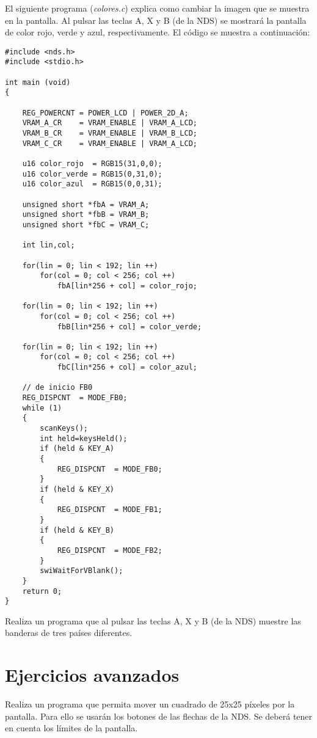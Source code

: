 \begin{example}
El siguiente programa (\textit{colores.c}) explica como cambiar la imagen que se muestra en la pantalla. Al pulsar las teclas A, X y B (de la NDS) se mostrará la pantalla de color rojo, verde y azul, respectivamente. El código se muestra a continuación:

\begin{lstlisting}	
#include <nds.h>
#include <stdio.h>

int main (void)
{
	
	REG_POWERCNT = POWER_LCD | POWER_2D_A;
	VRAM_A_CR    = VRAM_ENABLE | VRAM_A_LCD;
	VRAM_B_CR    = VRAM_ENABLE | VRAM_B_LCD;
	VRAM_C_CR    = VRAM_ENABLE | VRAM_A_LCD;
	
	u16 color_rojo  = RGB15(31,0,0);
	u16 color_verde = RGB15(0,31,0);
	u16 color_azul  = RGB15(0,0,31);
	
	unsigned short *fbA = VRAM_A;
	unsigned short *fbB = VRAM_B;
	unsigned short *fbC = VRAM_C;
	
	int lin,col;
	
	for(lin = 0; lin < 192; lin ++)
		for(col = 0; col < 256; col ++)
			fbA[lin*256 + col] = color_rojo;
	
	for(lin = 0; lin < 192; lin ++)
		for(col = 0; col < 256; col ++)
			fbB[lin*256 + col] = color_verde;
	
	for(lin = 0; lin < 192; lin ++)
		for(col = 0; col < 256; col ++)
			fbC[lin*256 + col] = color_azul;
	
	// de inicio FB0
	REG_DISPCNT  = MODE_FB0;
	while (1)
	{
		scanKeys();
		int held=keysHeld();
		if (held & KEY_A)
		{
			REG_DISPCNT  = MODE_FB0;
		}
		if (held & KEY_X)
		{
			REG_DISPCNT  = MODE_FB1;
		}
		if (held & KEY_B)
		{
			REG_DISPCNT  = MODE_FB2;
		}
		swiWaitForVBlank();
	}
	return 0;
}
\end{lstlisting}
\end{example}


\begin{exercise}
Realiza un programa que al pulsar las teclas A, X y B (de la NDS) muestre las banderas de tres países diferentes.
\end{exercise}


\section{Ejercicios avanzados}

\begin{exercise}
Realiza un programa que permita mover un cuadrado de 25x25 píxeles por la pantalla. Para ello se usarán los botones de las flechas de la NDS. Se deberá tener en cuenta los límites de la pantalla.
\end{exercise}






